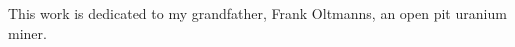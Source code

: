 \documentclass[letterpaper,10pt]{article} %
\begin{document}
\begin{acknowledgments}

\end{acknowledgments} \newpage

\begin{dedication}
This work is dedicated to my grandfather, Frank Oltmanns, an open pit uranium miner.
\end{dedication}\newpage


\bodymatter     %











\end{document}
